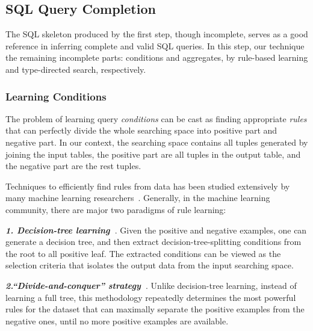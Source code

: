\subsection{SQL Query Completion}
\label{sec:completion}

The SQL skeleton produced by the first step, though incomplete,
serves as a good reference in inferring complete and valid SQL queries.
In this step, our technique the remaining incomplete parts: conditions and
aggregates, by rule-based learning and type-directed search, respectively.

\subsubsection{Learning Conditions}
\label{sec:decision_tree}

The problem of learning query \textit{conditions} can be cast as finding
appropriate \textit{rules} that can perfectly divide the whole searching space
into positive part and negative part. In our context, the searching space
contains all tuples generated by joining the input tables, the positive part
are all tuples in the output table, and the negative part are the rest
tuples.


Techniques to efficiently find rules from data has been studied extensively
by many machine learning researchers~\cite{Quinlan:1993, Cohen:1995, Frank:1998}.
Generally, in the machine learning community, there are major two paradigms of
rule learning:

\vspace{1mm}
\noindent\textbf{\textit{1. Decision-tree learning~\cite{Quinlan:1993}}}. Given
the positive and negative examples, one can generate a decision
tree, and then extract decision-tree-splitting conditions from the root to
all positive leaf. The extracted conditions can be viewed as the selection
criteria that isolates the output data from the input searching space.


\vspace{1mm}
\noindent\textbf{\textit{2.``Divide-and-conquer'' strategy~\cite{Pagallo:1990}}}. 
Unlike decision-tree learning, instead of learning a full tree,
this methodology repeatedly determines the most powerful rules for the dataset
that can maximally separate the positive examples from the negative ones, until
no more positive examples are available.

